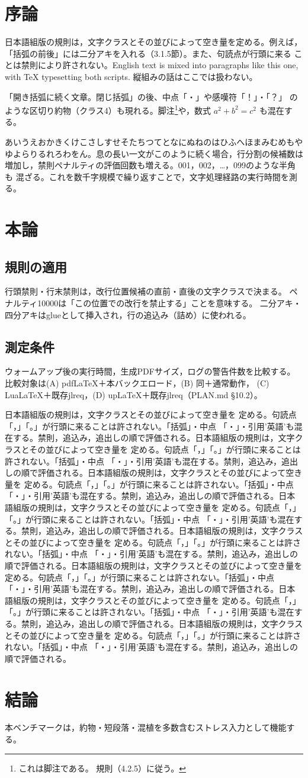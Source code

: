 \documentclass[pdflatex]{jlreq}
\begin{document}
\section{序論}
日本語組版の規則は，文字クラスとその並びによって空き量を定める。例えば，
「括弧の前後」には二分アキを入れる（3.1.5節）。また、句読点が行頭に来る
ことは禁則により許されない。English text is mixed into paragraphs like this
one, with TeX typesetting both scripts. 縦組みの話はここでは扱わない。

「開き括弧に続く文章。閉じ括弧」の後、中点「・」や感嘆符「！」・「？」
のような区切り約物（クラス4）も現れる。脚注\footnote{これは脚注である。
規則（4.2.5）に従う。}や，数式 $a^2+b^2=c^2$ も混在する。

あいうえおかきくけこさしすせそたちつてとなにぬねのはひふへほまみむめもや
ゆよらりるれろわをん。息の長い一文がこのように続く場合，行分割の候補数は
増加し，禁則ペナルティの評価回数も増える。001，002，…，099のような半角も
混ざる。これを数千字規模で繰り返すことで，文字処理経路の実行時間を測る。

\section{本論}
\subsection{規則の適用}
行頭禁則・行末禁則は，改行位置候補の直前・直後の文字クラスで決まる。
ペナルティ10000は「この位置での改行を禁止する」ことを意味する。
二分アキ・四分アキはglueとして挿入され，行の追込み（詰め）に使われる。

\subsection{測定条件}
ウォームアップ後の実行時間，生成PDFサイズ，ログの警告件数を比較する。
比較対象は(A) pdfLaTeX＋本バックエロード，(B) 同＋通常動作，
(C) LuaLaTeX＋既存jlreq，(D) upLaTeX＋既存jlreq（PLAN.md §10.2）。

\def\para#1{#1 #1 #1 #1 #1}
\def\parablock{日本語組版の規則は，文字クラスとその並びによって空き量を
定める。句読点「，」「。」が行頭に来ることは許されない。「括弧」・中点
「・」・引用'英語'も混在する。禁則，追込み，追出しの順で評価される。}

\parablock\parablock\parablock\parablock\parablock\parablock\parablock\parablock

\section{結論}
本ベンチマークは，約物・短段落・混植を多数含むストレス入力として機能する。
\end{document}
